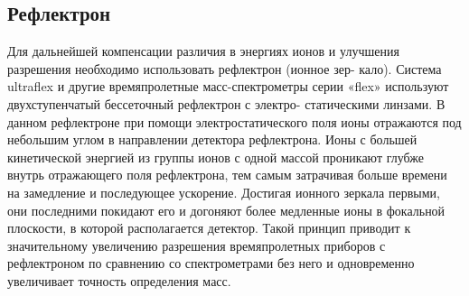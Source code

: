 \documentclass{article}
\begin{document}
\subsection{Рефлектрон}\;
\par Для дальнейшей компенсации различия в энергиях ионов и улучшения разрешения необходимо использовать рефлектрон (ионное зер-
кало).
Система ultraflex и другие времяпролетные масс-спектрометры серии
«flex» используют двухступенчатый бессеточный рефлектрон с электро-
статическими линзами. В данном рефлектроне при помощи электростатического поля ионы отражаются под небольшим углом в направлении детектора рефлектрона. Ионы с большей кинетической энергией из группы ионов с одной массой проникают глубже внутрь отражающего поля рефлектрона, тем самым затрачивая больше времени на замедление и последующее ускорение. Достигая ионного зеркала первыми, они последними покидают его и догоняют более медленные ионы в фокальной плоскости, в которой располагается детектор. Такой принцип приводит к значительному увеличению разрешения времяпролетных приборов с рефлектроном по сравнению со спектрометрами без него и одновременно увеличивает точность определения масс.
\end{document}
